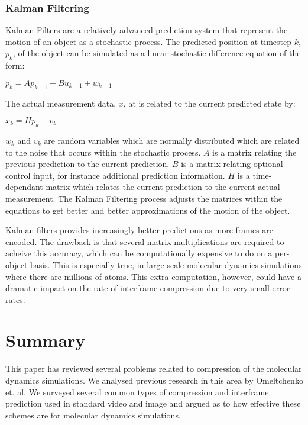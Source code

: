 \documentclass[twocolumn, a4paper,10pt]{article}
\begin{document}
\subsubsection*{Kalman Filtering}

Kalman Filters are a relatively advanced prediction system that represent the motion of an object as a stochastic process.\cite{welch1995ikf} The predicted position at timestep $k$, $p_k$, of the object can be simulated as a linear stochastic difference equation of the form:
\begin{center} $p_k = Ap_{k-1} + Bu_{k-1} + w_{k-1}$  \end{center}
The actual measurement data, $x$, at is related to the current predicted state by:
\begin{center} $x_k = Hp_k + v_k$ \end{center}
$w_k$ and $v_k$ are random variables which are normally distributed which are related to the noise that occurs within the stochastic process. $A$ is a matrix relating the previous prediction to the current prediction. $B$ is a matrix relating optional control input, for instance additional prediction information. $H$ is a time-dependant matrix which relates the current prediction to the current actual measurement. The Kalman Filtering process adjusts the matrices within the equations to get better and better approximations of the motion of the object.

Kalman filters provides increasingly better predictions as more frames are encoded. The drawback is that several matrix multiplications are required to acheive this accuracy, which can be computationally expensive to do on a per-object basis. This is especially true, in large scale molecular dynamics simulations where there are millions of atoms. This extra computation, however, could have a dramatic impact on the rate of interframe compression due to very small error rates.

\section*{Summary}

This paper has reviewed several problems related to compression of the molecular dynamics simulations. We analysed previous research in this area by Omeltchenko et. al. We surveyed several common types of compression and interframe prediction used in standard video and image and argued as to how effective these schemes are for molecular dynamics simulations.
\end{document}
